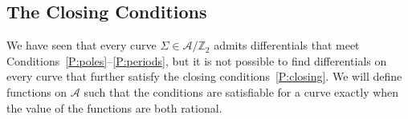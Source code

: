 \documentclass{article}
\numberwithin{equation}{section}
\numberwithin{figure}{section}
\DeclareMathOperator{\pp}{pp.}
\newcommand{\iu}{i}
\newcommand{\R}{\mathbb{R}}
\begin{document}










\subsection{The Closing Conditions}\label{sub:Closing Conditions}
We have seen that every curve $\Sigma\in\mathcal{A}/\mathbb{Z}_2$ admits differentials that meet Conditions~\ref{P:poles}--\ref{P:periods}, but it is not possible to find differentials on every curve that further satisfy the closing conditions~\ref{P:closing}. We will define functions on $\mathcal{A}$ such that the conditions are satisfiable for a curve exactly when the value of the functions are both rational.
\end{document}
